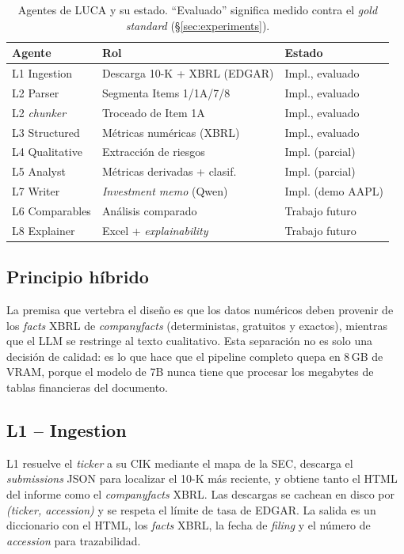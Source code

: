 \documentclass[conference]{IEEEtran}
\begin{document}
\begin{table}[t]
\centering
\caption{Agentes de LUCA y su estado. ``Evaluado'' significa medido contra el
\textit{gold standard} (\S\ref{sec:experiments}).}
\label{tab:agents}
\small
\begin{tabular}{@{}lp{}p{}@{}}
\toprule
Agente & Rol & Estado \\
\midrule
L1 Ingestion & Descarga 10-K + XBRL (EDGAR) & Impl., evaluado \\
L2 Parser & Segmenta Items 1/1A/7/8 & Impl., evaluado \\
L2 \textit{chunker} & Troceado de Item 1A & Impl., evaluado \\
L3 Structured & Métricas numéricas (XBRL) & Impl., evaluado \\
L4 Qualitative & Extracción de riesgos & Impl. (parcial) \\
L5 Analyst & Métricas derivadas + clasif. & Impl. (parcial) \\
L7 Writer & \textit{Investment memo} (Qwen) & Impl. (demo AAPL) \\
L6 Comparables & Análisis comparado & Trabajo futuro \\
L8 Explainer & Excel + \textit{explainability} & Trabajo futuro \\
\bottomrule
\end{tabular}
\end{table}

\subsection{Principio híbrido}
La premisa que vertebra el diseño es que los datos numéricos deben provenir de
los \textit{facts} XBRL de \textit{companyfacts} (deterministas, gratuitos y
exactos), mientras que el LLM se restringe al texto cualitativo. Esta separación
no es solo una decisión de calidad: es lo que hace que el pipeline completo
quepa en 8\,GB de VRAM, porque el modelo de 7B nunca tiene que procesar los
megabytes de tablas financieras del documento.

\subsection{L1 -- Ingestion}
L1 resuelve el \textit{ticker} a su CIK mediante el mapa de la SEC, descarga el
\textit{submissions} JSON para localizar el 10-K más reciente, y obtiene tanto
el HTML del informe como el \textit{companyfacts} XBRL. Las descargas se cachean
en disco por \textit{(ticker, accession)} y se respeta el límite de tasa de
EDGAR. La salida es un diccionario con el HTML, los \textit{facts} XBRL, la fecha
de \textit{filing} y el número de \textit{accession} para trazabilidad.
\end{document}
